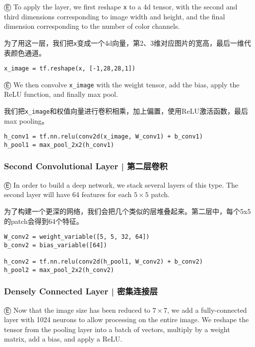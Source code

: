 Ⓔ \textcolor{etc}{To apply the layer, we first reshape \lstinline{x} to a 4d tensor, with the second and third dimensions corresponding to image width and height, and the final dimension corresponding to the number of color channels.}

为了用这一层，我们把\lstinline{x}变成一个4d向量，第2、3维对应图片的宽高，最后一维代表颜色通道。

\begin{lstlisting}
x_image = tf.reshape(x, [-1,28,28,1])
\end{lstlisting}

Ⓔ \textcolor{etc}{We then convolve \lstinline{x_image} with the weight tensor, add the bias, apply the ReLU function, and finally max pool.}

我们把\lstinline{x_image}和权值向量进行卷积相乘，加上偏置，使用ReLU激活函数，最后max pooling。

\begin{lstlisting}
h_conv1 = tf.nn.relu(conv2d(x_image, W_conv1) + b_conv1)
h_pool1 = max_pool_2x2(h_conv1)
\end{lstlisting}

%
\subsubsection{Second Convolutional Layer  |  第二层卷积}

Ⓔ \textcolor{etc}{In order to build a deep network, we stack several layers of this type. The second layer will have 64 features for each $5\times5$ patch.}

为了构建一个更深的网络，我们会把几个类似的层堆叠起来。第二层中，每个5x5的patch会得到64个特征。

\begin{lstlisting}
W_conv2 = weight_variable([5, 5, 32, 64])
b_conv2 = bias_variable([64])

h_conv2 = tf.nn.relu(conv2d(h_pool1, W_conv2) + b_conv2)
h_pool2 = max_pool_2x2(h_conv2)
\end{lstlisting}

%
\subsubsection{Densely Connected Layer  |  密集连接层}

Ⓔ \textcolor{etc}{Now that the image size has been reduced to $7\times7$, we add a fully-connected layer with 1024 neurons to allow processing on the entire image. We reshape the tensor from the pooling layer into a batch of vectors, multiply by a weight matrix, add a bias, and apply a ReLU.}


